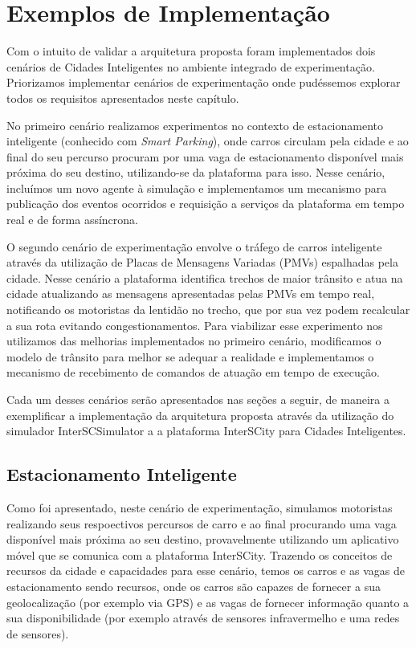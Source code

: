 \section{Exemplos de Implementação}

Com o intuito de validar a arquitetura proposta foram implementados dois cenários de Cidades Inteligentes no ambiente integrado de experimentação.
Priorizamos implementar cenários de experimentação onde pudéssemos explorar todos os requisitos apresentados neste capítulo.

No primeiro cenário realizamos experimentos no contexto de estacionamento inteligente (conhecido com \textit{Smart Parking}), onde carros circulam pela cidade e ao
final do seu percurso procuram por uma vaga de estacionamento disponível mais próxima do seu destino, utilizando-se da plataforma para isso.
Nesse cenário, incluímos um novo agente à simulação e implementamos um mecanismo para publicação dos eventos ocorridos e requisição a serviços da plataforma em tempo real
e de forma assíncrona.

O segundo cenário de experimentação envolve o tráfego de carros inteligente através da utilização de Placas de Mensagens Variadas (PMVs) espalhadas pela cidade.
Nesse cenário a plataforma identifica trechos de maior trânsito e atua na cidade atualizando as mensagens apresentadas pelas PMVs em tempo real, notificando os
motoristas da lentidão no trecho, que por sua vez podem recalcular a sua rota evitando congestionamentos.
Para viabilizar esse experimento nos utilizamos das melhorias implementados no primeiro cenário, modificamos o modelo de trânsito para melhor se adequar a realidade e
implementamos o mecanismo de recebimento de comandos de atuação em tempo de execução.

Cada um desses cenários serão apresentados nas seções a seguir, de maneira a exemplificar a implementação da arquitetura proposta através da utilização do simulador
InterSCSimulator a a plataforma InterSCity para Cidades Inteligentes.

\subsection{Estacionamento Inteligente}
\label{sec:smart_parking}

Como foi apresentado, neste cenário de experimentação, simulamos motoristas realizando seus respoectivos percursos de carro e ao final procurando uma vaga disponível mais próxima ao
seu destino, provavelmente utilizando um aplicativo móvel que se comunica com a plataforma InterSCity.
Trazendo os conceitos de recursos da cidade e capacidades para esse cenário, temos os carros e as vagas de estacionamento sendo recursos, onde os carros são capazes de
fornecer a sua geolocalização (por exemplo via GPS) e as vagas de fornecer informação quanto a sua disponibilidade (por exemplo através de sensores infravermelho e uma
redes de sensores).

